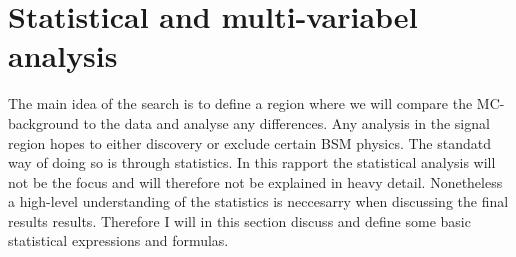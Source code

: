\chapter{Statistical and multi-variabel analysis}
The main idea of the search is to define a region where we will compare
the \ac{MC}-background to the data and analyse any differences. Any analysis
in the signal region hopes to either discovery or exclude certain \ac{BSM}
physics. The standatd way of doing so is through statistics. In this rapport
the statistical analysis will not be the focus and will therefore not be
explained in heavy detail. Nonetheless a high-level understanding of the 
statistics is neccesarry when discussing the final results results. Therefore 
I will in this section discuss and define some basic statistical 
expressions and formulas.
